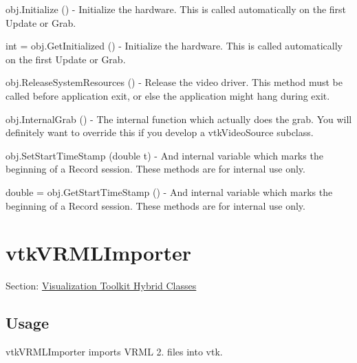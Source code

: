\begin{DoxyItemize}
\item {\ttfamily obj.\-Initialize ()} -\/ Initialize the hardware. This is called automatically on the first Update or Grab.  
\item {\ttfamily int = obj.\-Get\-Initialized ()} -\/ Initialize the hardware. This is called automatically on the first Update or Grab.  
\item {\ttfamily obj.\-Release\-System\-Resources ()} -\/ Release the video driver. This method must be called before application exit, or else the application might hang during exit.  
\item {\ttfamily obj.\-Internal\-Grab ()} -\/ The internal function which actually does the grab. You will definitely want to override this if you develop a vtk\-Video\-Source subclass.  
\item {\ttfamily obj.\-Set\-Start\-Time\-Stamp (double t)} -\/ And internal variable which marks the beginning of a Record session. These methods are for internal use only.  
\item {\ttfamily double = obj.\-Get\-Start\-Time\-Stamp ()} -\/ And internal variable which marks the beginning of a Record session. These methods are for internal use only.  
\end{DoxyItemize}\hypertarget{vtkhybrid_vtkvrmlimporter}{}\section{vtk\-V\-R\-M\-L\-Importer}\label{vtkhybrid_vtkvrmlimporter}
Section\-: \hyperlink{sec_vtkhybrid}{Visualization Toolkit Hybrid Classes} \hypertarget{vtkwidgets_vtkxyplotwidget_Usage}{}\subsection{Usage}\label{vtkwidgets_vtkxyplotwidget_Usage}
vtk\-V\-R\-M\-L\-Importer imports V\-R\-M\-L 2. files into vtk.


